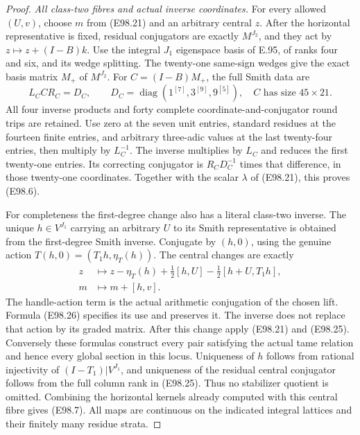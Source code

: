 \begin{proof}
\emph{All class-two fibres and actual inverse coordinates.}
For every allowed $(U,v)$, choose $m$ from (E98.21)
and an arbitrary central $z$. After the horizontal
representative is fixed, residual conjugators are
exactly $M^{J_2}$, and they act by
$z\mapsto z+(I-B)k$. Use the integral $J_1$ eigenspace
basis of E.95, of ranks four and six, and its wedge
splitting. The twenty-one same-sign wedges give
the exact basis matrix $M_+$ of $M^{J_2}$.
For $C=(I-B)M_+$, the full Smith data are
\[
 L_C C R_C=D_C,\qquad
 D_C=\operatorname{diag}(1^{[7]},3^{[9]},9^{[5]}),
                    \quad C\text{ has size }45\times21.
 \tag{E98.25}
\]
All four inverse products and forty complete
coordinate-and-conjugator round trips are retained.
Use zero at the seven unit entries, standard
residues at the fourteen finite entries, and
arbitrary three-adic values at the last twenty-four
entries, then multiply by $L_C^{-1}$. The inverse
multiplies by $L_C$ and reduces the first twenty-one
entries. Its correcting conjugator is
$R_C D_C^{-1}$ times that difference, in those
twenty-one coordinates. Together with the scalar
$\lambda$ of (E98.21), this proves (E98.6).

For completeness the first-degree change also
has a literal class-two inverse. The unique
$h\in V^{J_1}$ carrying an arbitrary $U$ to its
Smith representative is obtained from the
first-degree Smith inverse. Conjugate by $(h,0)$,
using the genuine action $T(h,0)=(T_1h,\eta_T(h))$.
The central changes are exactly
\[
 \begin{split}
 z&\longmapsto z-\eta_T(h)
       +\tfrac12[h,U]-\tfrac12[h+U,T_1h],\\
 m&\longmapsto m+[h,v].
 \end{split}
 \tag{E98.26}
\]
The handle-action term is the actual arithmetic
conjugation of the chosen lift. Formula (E98.26)
specifies its use and preserves it. The inverse
does not replace that action by its graded matrix.
After this change apply (E98.21) and (E98.25).
Conversely these formulas construct every pair
satisfying the actual tame relation and hence
every global section in this locus. Uniqueness
of $h$ follows from rational injectivity of
$(I-T_1)|V^{J_1}$, and uniqueness of the residual
central conjugator follows from the full column
rank in (E98.25). Thus no stabilizer quotient is
omitted. Combining the horizontal kernels already
computed with this central fibre gives (E98.7).
All maps are continuous on the indicated integral
lattices and their finitely many residue strata.


\end{proof}
